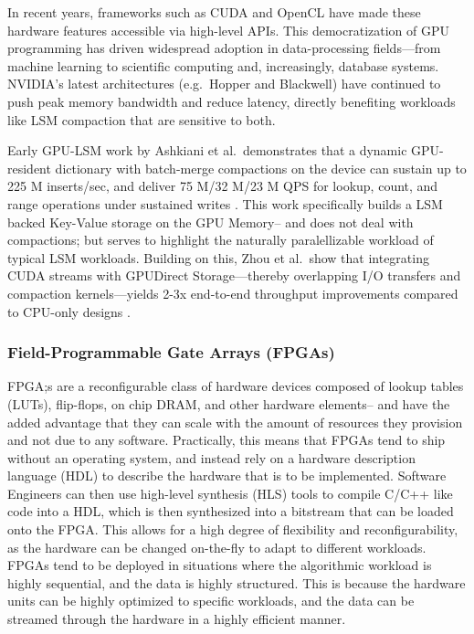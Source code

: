 \documentclass[sigconf]{acmart}
\begin{document}
  In recent years, frameworks such as CUDA and OpenCL have made these hardware features accessible via high-level APIs.
  This democratization of GPU programming has driven widespread adoption in data-processing fields—from machine learning to scientific computing and, increasingly, database systems.
  NVIDIA's latest architectures (e.g.\ Hopper and Blackwell) have continued to push peak memory bandwidth and reduce latency, directly benefiting workloads like LSM compaction that are sensitive to both.

  Early GPU-LSM work by Ashkiani et al.\ demonstrates that a dynamic GPU-resident dictionary with batch-merge compactions on the device can sustain up to 225 M inserts/sec, and deliver 75 M/32 M/23 M QPS for lookup, count, and range operations under sustained writes \cite{ashkiani2018gpu}.  This work specifically builds a LSM backed Key-Value storage on the GPU Memory-- and does not deal with compactions; but serves to highlight the naturally paralellizable workload of typical LSM workloads.
  Building on this, Zhou et al.\ show that integrating CUDA streams with GPUDirect Storage—thereby overlapping I/O transfers and compaction kernels—yields 2-3x end-to-end throughput improvements compared to CPU-only designs \cite{zhou2024gpuaccel}.

  \subsubsection{Field-Programmable Gate Arrays (FPGAs)}
  FPGA;s are a reconfigurable class of hardware devices composed of lookup tables (LUTs), flip-flops, on chip DRAM, and other hardware elements-- and have the added advantage that they can scale with the amount of resources they provision and not due to any software.
  Practically, this means that FPGAs tend to ship without an operating system, and instead rely on a hardware description language (HDL) to describe the hardware that is to be implemented. Software Engineers can then use high-level synthesis (HLS) tools to compile C/C++ like code into a HDL, which is then synthesized into a bitstream that can be loaded onto the FPGA. This allows for a high degree of flexibility and reconfigurability, as the hardware can be changed on-the-fly to adapt to different workloads.
  FPGAs tend to be deployed in situations where the algorithmic workload is highly sequential, and the data is highly structured. This is because the hardware units can be highly optimized to specific workloads, and the data can be streamed through the hardware in a highly efficient manner.
\end{document}
